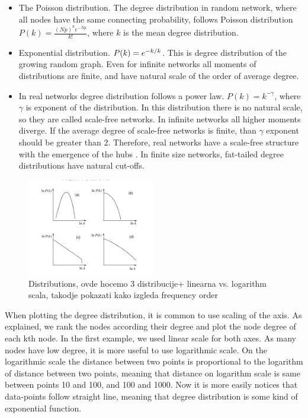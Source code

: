 \begin{itemize}
	\item The Poisson distribution. The degree distribution in random network, where all nodes have the same connecting probability, follows Poisson distribution $P(k)= \frac{(Np)^ke^{-Np}}{k!}$, where $k$ is the mean degree distribution. 
	
	\item Exponential distribution. $P(k) = e^{-k/ \- k}$. This is degree distribution of the growing random graph. Even for infinite networks all moments of distributions are finite, and have natural scale of the order of average degree.
	
	\item In real networks degree distribution follows a power law. $P(k) = k ^ {-\gamma} $, where $\gamma$ is exponent of the distribution. In this distribution there is no natural scale, so they are called scale-free networks. In infinite networks all higher moments diverge. If the average degree of scale-free networks is finite, than $\gamma$ exponent should be greater than 2. Therefore, real networks have a scale-free structure with the emergence of the hubs \cite{newman2010}. In finite size networks, fat-tailed degree distributions have natural cut-offs. 
\end{itemize}

 \begin{figure}
 	\centering
 	\includegraphics[width=0.5\textwidth]{figures/methodology/distributions.png}
 	\caption{Distributions, ovde hocemo 3 distribucije+ linearna vs. logarithm scala, takodje pokazati kako izgleda frequency order}
 	\label{fig:dist}
 \end{figure}

When plotting the degree distribution, it is common to use scaling of the axis. As explained, we rank the nodes according their degree and plot the node degree of each kth node. In the first example, we used linear scale for both axes. As many nodes have  low degree, it is more useful to use logarithmic scale. On the logarithmic scale the distance between two points is proportional to the logarithm of distance between two points, meaning that distance on logarithm scale is same between points 10 and 100, and 100 and 1000.  Now it is more easily notices that data-points follow straight line, meaning that degree distribution is some kind of exponential function. 

